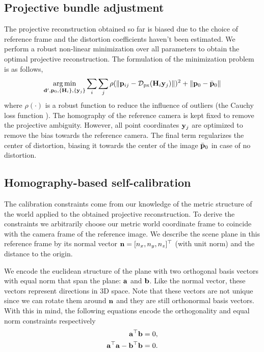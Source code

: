 \documentclass[10pt,twocolumn,letterpaper]{article}
\begin{document}
\subsection{Projective bundle adjustment}
\label{sec:projective:ba}

The projective reconstruction obtained so far is biased due to the choice of reference frame and the distortion coefficients haven't been estimated. We perform a robust non-linear minimization \cite{ceres-solver} over all parameters to obtain the optimal projective reconstruction. The formulation of the minimization problem is as follows, 
%
\begin{align}
\argmin_{\dv',\pv_0,\lbrace \Hm_i \rbrace, \lbrace \yv_j \rbrace} 
%
\sum_i \sum_j \rho(\norm{\pv_{ij} - \Distortion_{\text{px}}(\Hm_i \yv_j)})^2 + \norm{\pv_0 - \bar{\pv}_0}
\end{align}
%
where $\rho(\cdot)$ is a robust function to reduce the influence of outliers (\eg the Cauchy loss function \cite{ceres-solver}). The homography of the reference camera is kept fixed to remove the projective ambiguity. However, all point coordinates $\mathbf{y}_j$ are optimized to remove the bias towards the reference camera. The final term regularizes the center of distortion, biasing it towards the center of the image $\bar{\mathbf{p}}_0$ in case of no distortion.

\subsection{Homography-based self-calibration}

The calibration constraints come from our knowledge of the metric structure of the world applied to the obtained projective reconstruction. To derive the constraints we arbitrarily choose our metric world coordinate frame to coincide with the camera frame of the reference image. We describe the scene plane in this reference frame by its normal vector $\mathbf{n}=[n_x,n_y,n_z]^\top$ (with unit norm) and the distance to the origin.

We encode the euclidean structure of the plane with two orthogonal basis vectors with equal norm that span the plane: $\mathbf{a}$ and $\mathbf{b}$. Like the normal vector, these vectors represent directions in 3D space. Note that these vectors are not unique since we can rotate them around $\mathbf{n}$ and they are still orthonormal basis vectors. With this in mind, the following equations encode the orthogonality and equal norm constraints respectively
\begin{align}
\mathbf{a}^\top \mathbf{b} = 0, \label{eq:ortho_constraint_ref} \\
\mathbf{a}^\top \mathbf{a} - \mathbf{b}^\top \mathbf{b} = 0. \label{eq:norm_constraint_ref}
\end{align}
\end{document}
